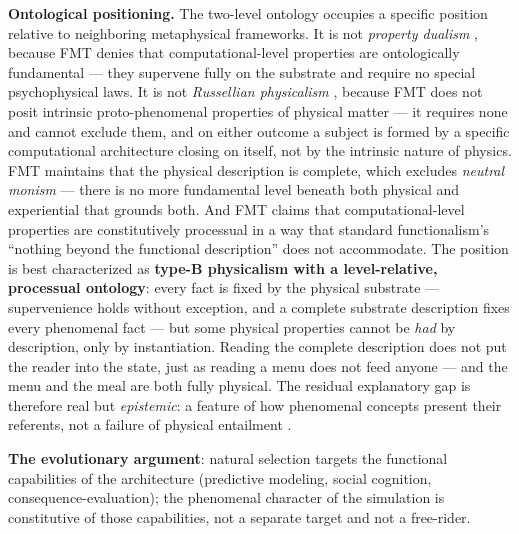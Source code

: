 \documentclass[12pt]{article}
\newcommand{\revend}{}
\begin{document}
{\textbf{Ontological positioning.} The two-level ontology occupies a specific position relative to neighboring metaphysical frameworks. It is not \emph{property dualism} \citep{Chalmers1996}, because FMT denies that computational-level properties are ontologically fundamental --- they supervene fully on the substrate and require no special psychophysical laws. It is not \emph{Russellian physicalism} \citep{Chalmers2015}, because FMT does not posit intrinsic proto-phenomenal properties of physical matter --- it requires none and cannot exclude them, and on either outcome a subject is formed by a specific computational architecture closing on itself, not by the intrinsic nature of physics. FMT maintains that the physical description is complete, which excludes \emph{neutral monism} --- there is no more fundamental level beneath both physical and experiential that grounds both. And FMT claims that computational-level properties are constitutively processual in a way that standard functionalism's ``nothing beyond the functional description'' does not accommodate. The position is best characterized as \textbf{type-B physicalism with a level-relative, processual ontology}: every fact is fixed by the physical substrate --- supervenience holds without exception, and a complete substrate description fixes every phenomenal fact --- but some physical properties cannot be \emph{had} by description, only by instantiation. Reading the complete description does not put the reader into the state, just as reading a menu does not feed anyone --- and the menu and the meal are both fully physical. The residual explanatory gap is therefore real but \emph{epistemic}: a feature of how phenomenal concepts present their referents, not a failure of physical entailment \citep{Loar1997,Papineau2002}.\revend}

\textbf{The evolutionary argument}: natural selection targets the functional capabilities of the architecture (predictive modeling, social cognition, consequence-evaluation); the phenomenal character of the simulation is constitutive of those capabilities, not a separate target and not a free-rider.
\end{document}
